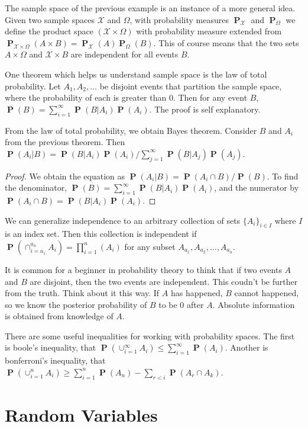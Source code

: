\documentclass{report}
\DeclareMathOperator{\prob}{\mathbf{P}}
\begin{document}
The sample space of the previous example is an instance of a more general idea. Given two sample spaces $\mathcal{X}$ and $\Omega$, with probability measures $\prob_\mathcal{X}$ and $\prob_\Omega$ we define the product space $(\mathcal{X} \times \Omega)$ with probability measure extended from $\prob_{\mathcal{X} \times \Omega}(A \times B) = \prob_\mathcal{X}(A) \prob_\Omega(B)$. This of course means that the two sets $A \times \Omega$ and $\mathcal{X} \times B$ are independent for all events $B$.

One theorem which helps us understand sample space is the law of total probability. Let $A_1, A_2, \dots$ be disjoint events that partition the sample space, where the probability of each is greater than $0$. Then for any event $B$, $\prob(B) = \sum_{i=1}^\infty \prob(B|A_i) \prob(A_i)$. The proof is self explanatory.

From the law of total probability, we obtain Bayes theorem. Consider $B$ and $A_i$ from the previous theorem. Then $\prob(A_i|B) = \prob(B|A_i) \prob(A_i) / \sum_{j = 1}^\infty \prob(B|A_j) \prob(A_j)$.
\begin{proof}
    We obtain the equation as $\prob(A_i | B) = \prob(A_i \cap B) / \prob(B)$. To find the denominator, $\prob(B) = \sum_{i=1}^\infty \prob(B | A_i) \prob(A_i)$, and the numerator by $\prob(A_i \cap B) = \prob(B | A_i) \prob(A_i)$.
\end{proof}

We can generalize independence to an arbitrary collection of sets $\{ A_i \}_{i \in I}$ where $I$ is an index set. Then this collection is independent if $\prob(\cap_{i=a_1}^{a_n} A_i) = \prod_{i=1}^n(A_i)$ for any subset $A_{a_1}, A_{a_2}, \dots, A_{a_n}$.

It is common for a beginner in probability theory to think that if two events $A$ and $B$ are disjoint, then the two events are independent. This coudn't be further from the truth. Think about it this way. If $A$ has happened, $B$ cannot happened, so we know the posterior probability of $B$ to be $0$ after $A$. Absolute information is obtained from knowledge of $A$.

There are some useful inequalities for working with probability spaces. The first is boole's inequality, that $\prob(\cup_{i=1}^\infty A_i) \leq \sum_{i=1}^\infty \prob(A_i)$. Another is bonferroni's inequality, that $\prob(\cup_{i=1}^n A_i) \geq \sum_{i=1}^n \prob(A_n) - \sum_{r < i} \prob(A_r \cap A_k)$.

\chapter{Random Variables}
\end{document}
